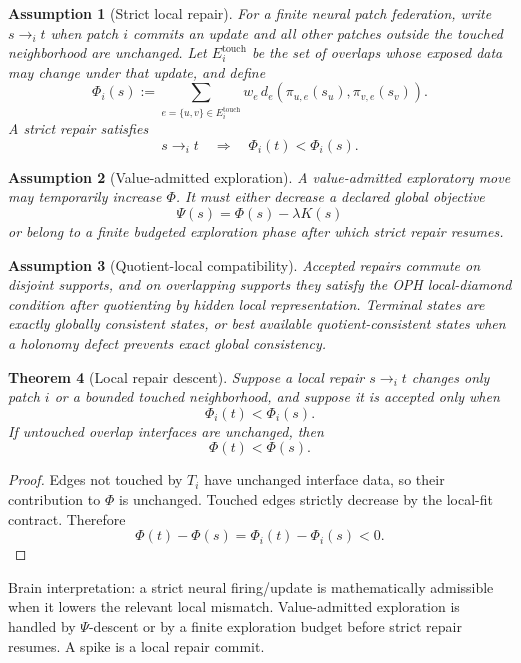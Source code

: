 \documentclass[11pt]{article}
\newtheorem{theorem}{Theorem}[section]
\newtheorem{assumption}[theorem]{Assumption}
\theoremstyle{remark}
\theoremstyle{plain}
\begin{document}
\begin{assumption}[Strict local repair]
For a finite neural patch federation, write \(s\to_i t\) when patch \(i\) commits an update and all other patches outside the touched neighborhood are unchanged. Let \(E_i^{\mathrm{touch}}\) be the set of overlaps whose exposed data may change under that update, and define
\[
\Phi_i(s):=
\sum_{e=\{u,v\}\in E_i^{\mathrm{touch}}}
w_e\,d_e\!\left(\pi_{u,e}(s_u),\pi_{v,e}(s_v)\right).
\]
A strict repair satisfies
\[
s\to_i t
\quad\Longrightarrow\quad
\Phi_i(t)<\Phi_i(s).
\]
\end{assumption}

\begin{assumption}[Value-admitted exploration]
A value-admitted exploratory move may temporarily increase \(\Phi\). It must either decrease a declared global objective
\[
\Psi(s)=\Phi(s)-\lambda K(s)
\]
or belong to a finite budgeted exploration phase after which strict repair resumes.
\end{assumption}

\begin{assumption}[Quotient-local compatibility]
Accepted repairs commute on disjoint supports, and on overlapping supports they satisfy the OPH local-diamond condition after quotienting by hidden local representation. Terminal states are exactly globally consistent states, or best available quotient-consistent states when a holonomy defect prevents exact global consistency.
\end{assumption}

\begin{theorem}[Local repair descent]
Suppose a local repair \(s\to_i t\) changes only patch \(i\) or a bounded touched neighborhood, and suppose it is accepted only when
\[
\Phi_i(t)<\Phi_i(s).
\]
If untouched overlap interfaces are unchanged, then
\[
\Phi(t)<\Phi(s).
\]
\end{theorem}

\begin{proof}
Edges not touched by \(T_i\) have unchanged interface data, so their contribution to \(\Phi\) is unchanged. Touched edges strictly decrease by the local-fit contract. Therefore
\[
\Phi(t)-\Phi(s)=\Phi_i(t)-\Phi_i(s)<0.
\]
\end{proof}

Brain interpretation: a strict neural firing/update is mathematically admissible when it lowers the relevant local mismatch. Value-admitted exploration is handled by \(\Psi\)-descent or by a finite exploration budget before strict repair resumes. A spike is a local repair commit.
\end{document}
